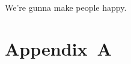 \documentclass[12pt,a4paper]{article}
\begin{document}



We're gunna make people happy.











\section*{Appendix~A}



















\end{document}
